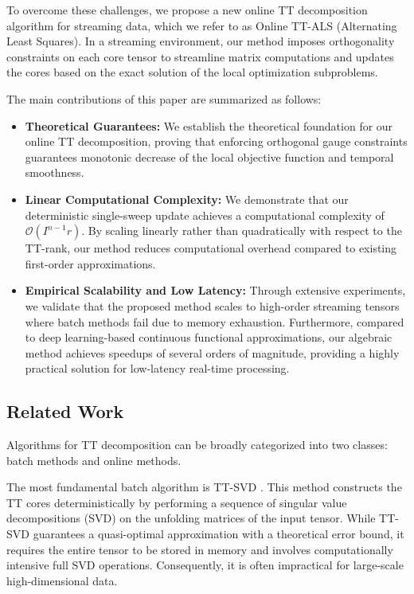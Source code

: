 \documentclass[a4paper, 11pt]{article}
\theoremstyle{plain}
\theoremstyle{definition}
\theoremstyle{remark}
\begin{document}
To overcome these challenges, we propose a new online TT decomposition algorithm for streaming data, which we refer to as Online TT-ALS (Alternating Least Squares).
In a streaming environment, our method imposes orthogonality constraints on each core tensor to streamline matrix computations and updates the cores based on the exact solution of the local optimization subproblems.

The main contributions of this paper are summarized as follows:
\begin{itemize}
    \item \textbf{Theoretical Guarantees:} We establish the theoretical foundation for our online TT decomposition, proving that enforcing orthogonal gauge constraints guarantees monotonic decrease of the local objective function and temporal smoothness.
    \item \textbf{Linear Computational Complexity:} We demonstrate that our deterministic single-sweep update achieves a computational complexity of $\mathcal{O}(I^{n-1} r)$.
    By scaling linearly rather than quadratically with respect to the TT-rank, our method reduces computational overhead compared to existing first-order approximations.
    \item \textbf{Empirical Scalability and Low Latency:} Through extensive experiments, we validate that the proposed method scales to high-order streaming tensors where batch methods fail due to memory exhaustion.
    Furthermore, compared to deep learning-based continuous functional approximations, our algebraic method achieves speedups of several orders of magnitude, providing a highly practical solution for low-latency real-time processing.
\end{itemize}

\subsection{Related Work}
Algorithms for TT decomposition can be broadly categorized into two classes: batch methods and online methods.

The most fundamental batch algorithm is TT-SVD \citep{Tensor-Train-Decomposition}.
This method constructs the TT cores deterministically by performing a sequence of singular value decompositions (SVD) on the unfolding matrices of the input tensor.
While TT-SVD guarantees a quasi-optimal approximation with a theoretical error bound, it requires the entire tensor to be stored in memory and involves computationally intensive full SVD operations.
Consequently, it is often impractical for large-scale high-dimensional data.
\end{document}

